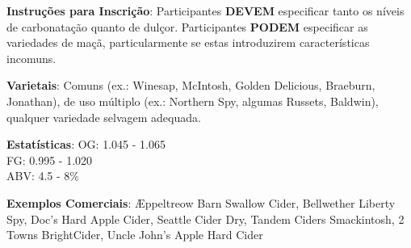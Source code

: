 \textbf{Instruções para Inscrição}: Participantes \textbf{DEVEM} especificar tanto os níveis de carbonatação quanto de dulçor. Participantes \textbf{PODEM} especificar as variedades de maçã, particularmente se estas introduzirem características incomuns.

\textbf{Varietais}: Comuns (ex.: Winesap, McIntosh, Golden Delicious, Braeburn, Jonathan), de uso múltiplo (ex.: Northern Spy, algumas Russets, Baldwin), qualquer variedade selvagem adequada.

\textbf{Estatísticas}: OG: 1.045 - 1.065 \\
\phantom{ } \hspace{16.5mm} FG: 0.995 - 1.020 \\
\phantom{ } \hspace{16.5mm} ABV: 4.5 - 8\%

\textbf{Exemplos Comerciais}: Æppeltreow Barn Swallow Cider, Bellwether Liberty Spy, Doc’s Hard Apple Cider, Seattle Cider Dry, Tandem Ciders Smackintosh, 2 Towns BrightCider, Uncle John’s Apple Hard Cider
